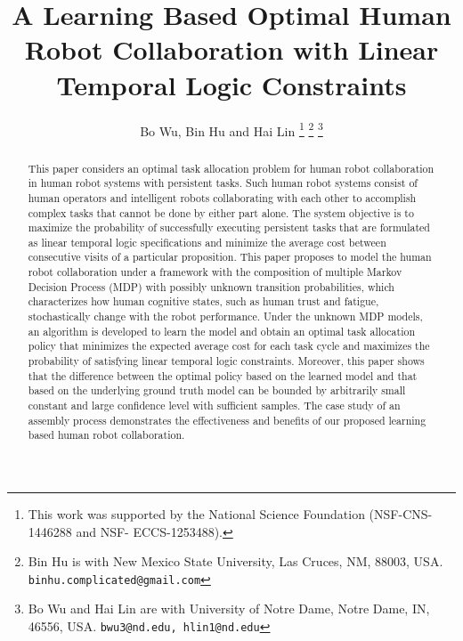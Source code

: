 \documentclass[journal]{IEEEtran}
\begin{document}
	
	\title{\Large \bf A Learning Based Optimal Human Robot Collaboration with Linear Temporal Logic Constraints}
	
	\author{Bo Wu, Bin Hu and Hai Lin	
		\thanks{This work was supported by the National Science Foundation (NSF-CNS-1446288  and NSF- ECCS-1253488). }	
		\thanks{
			Bin Hu is with New Mexico State University, Las Cruces, NM, 88003, USA. {\tt\small binhu.complicated@gmail.com}} 
		\thanks{Bo Wu and Hai Lin are with University of Notre Dame, Notre Dame, IN, 46556, USA. {\tt\small bwu3@nd.edu, hlin1@nd.edu}}}
	\maketitle
	
	\begin{abstract}
		This paper considers an optimal task allocation problem  for human robot collaboration in human robot systems with persistent tasks. Such human robot systems consist of human operators and intelligent robots collaborating with each other to accomplish complex tasks that cannot be done by either part alone. The system objective is to maximize the probability of successfully executing
		persistent tasks that are formulated as linear temporal logic specifications and minimize the average cost between consecutive visits of a particular proposition. This paper proposes to model the human robot collaboration under a framework with the composition of multiple Markov Decision Process (MDP) with possibly unknown transition probabilities, which characterizes how human cognitive states, such as human trust and fatigue, stochastically change with the robot performance. Under the unknown MDP models, an algorithm is developed to learn the model and obtain an optimal task allocation policy that minimizes the expected average cost for each task cycle and maximizes the probability of satisfying linear temporal logic constraints. Moreover, this paper shows that the difference between the optimal policy based on the learned model and that based on the underlying ground truth model can be bounded by arbitrarily small  constant and large confidence level with sufficient samples. The case study of an assembly process demonstrates the effectiveness and benefits of our proposed learning based human robot collaboration.
		
	\end{abstract}
	\renewcommand{\abstractname}{Note to Practitioners}
 
\end{document}
